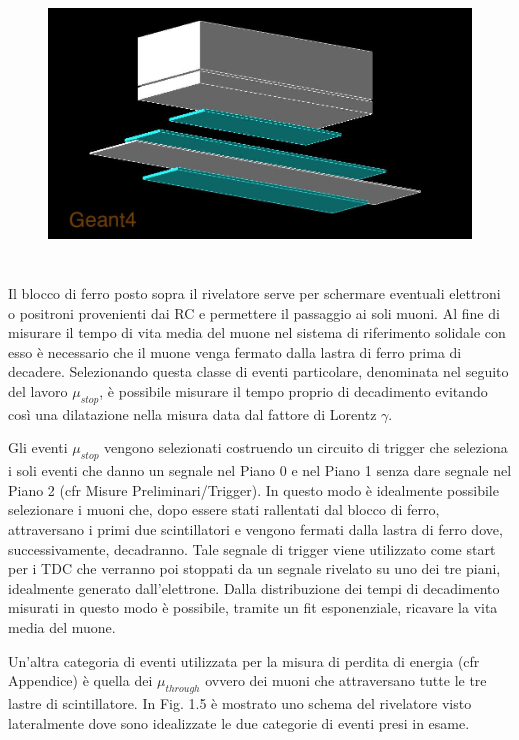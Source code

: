 \documentclass{standalone}
\begin{document}
\begin{figure}[H]
	\centering
  \includegraphics[width=12cm, height=7.5cm]{images/general.jpg}
	\caption{}
\end{figure}

\clearpage

Il blocco di ferro posto sopra il rivelatore serve per schermare eventuali elettroni o positroni provenienti dai RC e permettere il passaggio ai soli muoni.
Al fine di misurare il tempo di vita media del muone nel sistema di riferimento solidale con esso è necessario che il muone venga fermato dalla lastra di ferro prima di decadere. Selezionando questa classe di eventi particolare, denominata nel seguito del lavoro $\mu_{stop}$, è possibile misurare il tempo proprio di decadimento evitando così una dilatazione nella misura data dal fattore di Lorentz $\gamma$.

Gli eventi $\mu_{stop}$ vengono selezionati costruendo un circuito di trigger che seleziona i soli eventi che danno un segnale nel Piano 0 e nel Piano 1 senza dare segnale nel Piano 2 (cfr Misure Preliminari/Trigger). In questo modo è idealmente possibile selezionare i muoni che, dopo essere stati rallentati dal blocco di ferro, attraversano i primi due scintillatori e vengono fermati dalla lastra di ferro dove, successivamente, decadranno.
Tale segnale di trigger viene utilizzato come start per i TDC che verranno poi stoppati da un segnale rivelato su uno dei tre piani, idealmente generato dall'elettrone. Dalla distribuzione dei tempi di decadimento misurati in questo modo è possibile, tramite un fit esponenziale, ricavare la vita media del muone.

Un'altra categoria di eventi utilizzata per la misura di perdita di energia (cfr Appendice) è quella dei $\mu_{through}$ ovvero dei muoni che attraversano tutte le tre lastre di scintillatore. In Fig. 1.5 è mostrato uno schema del rivelatore visto lateralmente dove sono idealizzate le due categorie di eventi presi in esame.
\end{document}
